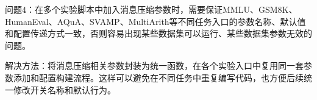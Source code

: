 \documentclass[11pt, a4paper]{article}
\numberwithin{figure}{section}
\begin{document}
问题4：在多个实验脚本中加入消息压缩参数时，需要保证MMLU、GSM8K、HumanEval、AQuA、SVAMP、MultiArith等不同任务入口的参数名称、默认值和配置传递方式一致，否则容易出现某些数据集可以运行、某些数据集参数无效的问题。

解决方法：将消息压缩相关参数封装为统一函数，在各个实验入口中复用同一套参数添加和配置构建流程。这样可以避免在不同任务中重复编写代码，也方便后续统一修改开关名称和默认行为。


\newpage
\newpage
{}
\renewcommand{\refname}{参考文献}
\begingroup
\fontsize{12pt}{18pt}\selectfont

\endgroup
\end{document}
